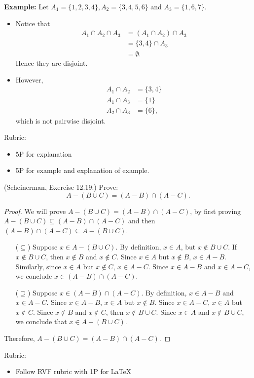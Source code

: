 \documentclass{article}
\theoremstyle{definition}
\begin{document}
\begin{solution}
\textbf{Example:} Let $A_1=\{1, 2, 3, 4\}, A_2=\{3, 4, 5, 6\}$ and $A_3=\{1, 6, 7\}$.
\begin{itemize}
\item Notice that 
\begin{align*}
A_1\cap A_2\cap A_3 &= (A_1\cap A_2)\cap A_3\\
&=\{3,4\}\cap A_3\\
&=\emptyset.
\end{align*} Hence they are disjoint.
\item However,
\begin{align*}
A_1\cap A_2 &=\{3, 4\}\\
A_1\cap A_3 &=\{1\}\\
A_2\cap A_3 &=\{6\},
\end{align*}
which is not pairwise disjoint.
\end{itemize}

{\color{red} Rubric:
\begin{itemize}
\item 5P for explanation
\item 5P for example and explanation of example.
\end{itemize}}
\end{solution}


\begin{question}
   (Scheinerman, Exercise 12.19:)
   Prove:
   \[ A-(B\cup C)=(A-B)\cap(A-C).\]
\end{question}
\begin{solution}
\begin{proof}
We will prove $A-(B\cup C) = (A-B)\cap(A-C)$, by first proving $A-(B\cup C) \subseteq (A-B)\cap(A-C)$ and then $(A-B)\cap(A-C)\subseteq A-(B\cup C)$.
\begin{enumerate}
\item[($\subseteq$)] Suppose $x\in A-(B\cup C)$. By definition, $x\in A$, but $x\notin B\cup C$. If $x\notin B\cup C$, then $x\notin B$ and $x\notin C$. Since $x\in A$ but $x\notin B$, $x\in A-B$. Similarly, since $x\in A$ but $x\notin C$, $x\in A-C$. Since $x\in A-B$ and $x\in A-C$, we conclude $x\in (A-B)\cap(A-C)$.

\item [($\supseteq$)] Suppose $x\in (A-B)\cap(A-C)$. By definition, $x\in A-B$ and $x\in A-C$. Since $x\in A-B$, $x\in A$ but $x\notin B$. Since $x\in A-C$, $x\in A$ but $x\notin C$. Since $x\notin B$ and $x\notin C$, then $x\notin B\cup C$. Since $x\in A$ and $x\notin B\cup C$, we conclude that $x\in A-(B\cup C)$.
\end{enumerate}
Therefore, $A-(B\cup C) = (A-B)\cap(A-C)$.
\end{proof}
{\color{red} Rubric:
\begin{itemize}
\item Follow RVF rubric with 1P for \LaTeX
\end{itemize}}
\end{solution}
\end{document}
